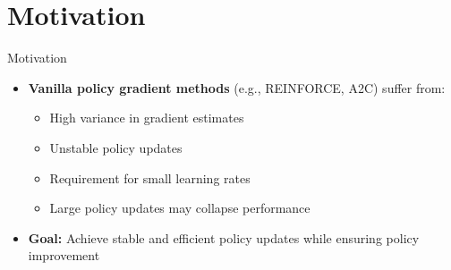 \section{Motivation}
\begin{frame}{Motivation}
    \begin{itemize}
        \setlength{\itemsep}{1em}
        \item \textbf{Vanilla policy gradient methods} (e.g., REINFORCE, A2C) suffer from:
        \begin{itemize}
            \setlength{\itemsep}{0.5em}
            \item High variance in gradient estimates
            \item Unstable policy updates
            \item Requirement for small learning rates
            \item Large policy updates may collapse performance
        \end{itemize}
        \item \textbf{Goal:} Achieve stable and efficient policy updates while ensuring policy improvement
    \end{itemize}
\end{frame}